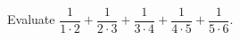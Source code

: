 Evaluate $\dfrac{1}{1\cdot2}+\dfrac{1}{2\cdot3}+\dfrac{1}{3\cdot4}+\dfrac{1}{4\cdot5}+\dfrac{1}{5\cdot6}$.
